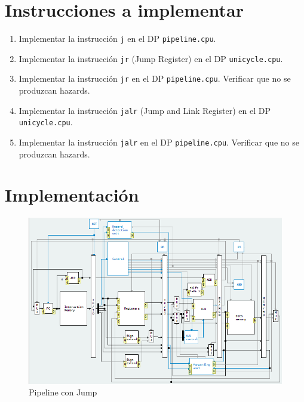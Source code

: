 \documentclass[11pt,a4paper, spanish]{article}
\begin{document}
\section{Instrucciones a implementar}

\begin{enumerate}
  \item Implementar la instrucción \texttt{j} en el DP \texttt{pipeline.cpu}.
  \item Implementar la instrucción \texttt{jr} (Jump Register) en el DP \texttt{unicycle.cpu}.
  \item Implementar la instrucción \texttt{jr} en el DP \texttt{pipeline.cpu}. Verificar que no se produzcan hazards.
  \item Implementar la instrucción \texttt{jalr} (Jump and Link Register) en el DP \texttt{unicycle.cpu}.
  \item Implementar la instrucción \texttt{jalr} en el DP \texttt{pipeline.cpu}. Verificar que no se produzcan hazards.
\end{enumerate}


\section{Implementación}


\begin{figure}
\begin{center}
\includegraphics[width=\textwidth,height=\textheight,keepaspectratio]{img/pipeline_con_jump.png}
\caption{Pipeline con Jump}
\end{center}
\end{figure}
\end{document}
